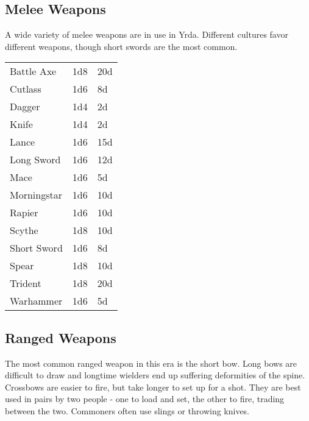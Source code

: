 \subsection{Melee Weapons}

A wide variety of melee weapons are in use in Yrda. Different
cultures favor different weapons, though short swords are the
most common.

\begin{center}
{
\begin{xtabular}{|l|l|l|}
Battle Axe & 1d8 & 20d \\
Cutlass & 1d6 & 8d \\
Dagger & 1d4 & 2d \\
Knife & 1d4 & 2d \\
Lance & 1d6 & 15d \\
Long Sword & 1d6 & 12d \\
Mace & 1d6 & 5d \\
Morningstar & 1d6 & 10d \\
Rapier & 1d6 & 10d \\
Scythe & 1d8 & 10d \\
Short Sword & 1d6 & 8d \\
Spear & 1d8 & 10d \\
Trident & 1d8 & 20d \\
Warhammer & 1d6 & 5d \\
\hline
\end{xtabular}
}
\end{center}

\subsection{Ranged Weapons}

The most common ranged weapon in this era is the short bow. Long bows
are difficult to draw and longtime wielders end up suffering deformities
of the spine. Crossbows are easier to fire, but take longer to set up for
a shot. They are best used in pairs by two people - one to load and set,
the other to fire, trading between the two. Commoners often use slings or
throwing knives.

